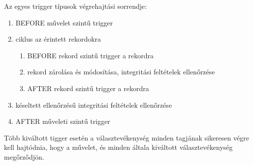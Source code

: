 \documentclass[tikz,12pt,margin=0px]{article}
\begin{document}
    \noindent Az egyes trigger típusok végrehajtási sorrendje:
    \begin{enumerate}
	\item BEFORE művelet szintű trigger
	\item ciklus az érintett rekordokra
    \begin{enumerate}
		\item BEFORE rekord szintű trigger a rekordra
		\item rekord zárolása és módosítása, integritási feltételek ellenőrzése
		\item AFTER rekord szintű trigger a rekordra
    \end{enumerate}
	\item késeltett ellenőrzésű integritási feltételek ellenőrzése
	\item AFTER műveleti szintű trigger
    \end{enumerate}
    \noindent Több kiváltott tigger esetén a választevékenység minden tagjának sikeresen végre kell hajtódnia, hogy a művelet, és minden általa kiváltott választevékenység megőrződjön.\\
\end{document}
